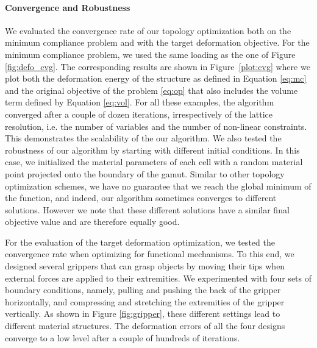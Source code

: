 \paragraph{Convergence and Robustness}
We evaluated the convergence rate of our topology optimization both on the minimum compliance problem and with the target deformation objective. For the minimum compliance problem, we used the same loading as the one of Figure \ref{fig:defo_cvg}. The corresponding results are shown in Figure~\ref{plot:cvg} where we plot both the deformation energy of the structure as defined in Equation \ref{eq:mc} and the original objective of the problem \ref{eq:op} that also includes the volume term defined by Equation \ref{eq:vol}. For all these examples, the algorithm converged after a couple of dozen iterations, irrespectively of the lattice resolution, i.e. the number of variables and the number of non-linear constraints. This demonstrates the scalability of the our algorithm. We also tested the robustness of our algorithm by starting with different initial conditions. In this case, we initialized the material parameters of each cell with a random material point projected onto the boundary of the gamut. Similar to other topology optimization schemes, we have no guarantee that we reach the global minimum of the function, and indeed, our algorithm sometimes converges to different solutions. However we note that these different solutions have a similar final objective value and are therefore equally good.

For the evaluation of the target deformation optimization, we tested the convergence rate when optimizing for functional mechanisms.
To this end, we designed several grippers that can grasp objects by moving their tips when external forces are applied to their extremities. We experimented with four sets of boundary conditions, namely, pulling and pushing the back of the gripper horizontally, and compressing and stretching the extremities of the gripper vertically. As shown in Figure \ref{fig:gripper}, these different settings lead to different material structures. The deformation errors of all the four designs converge to a low level after a couple of hundreds of iterations.

